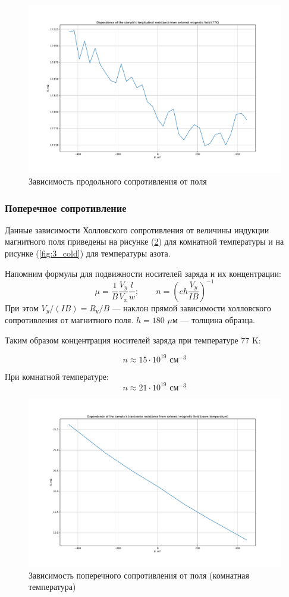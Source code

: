 \documentclass[a4paper, 12pt]{article}
\begin{document}
\begin{figure}[H]
	\centering
	\includegraphics[width=\linewidth]{3_longitudunal.pdf}
	\caption{Зависимость продольного сопротивления от поля}
	\label{fig:3_long}
\end{figure}

\subsubsection{Поперечное сопротивление}

Данные зависимости Холловского сопротивления от величины индукции магнитного поля приведены на рисунке (\ref{fig:3_room}) для комнатной температуры и на рисунке (\ref{fig:3_cold}) для температуры азота.

Напомним формулы для подвижности носителей заряда и их концентрации:
$$\mu=\frac{1}{B}\frac{V_y}{V_x}\frac{l}{w}; \qquad n=\left(eh\frac{V_y}{IB}\right)^{-1}  $$
При этом $V_y/(IB) = R_y/B$ --- наклон прямой зависимости холловского сопротивления от магнитного поля. $h = 180$ $\mu$м --- толщина образца.

Таким образом концентрация носителей заряда при температуре 77 K:

$$n\approx15 \cdot 10^{19}\text{ см}^{-3}$$ 

При комнатной температуре:
$$n\approx21 \cdot 10^{19}\text{ см}^{-3}$$ 
\begin{figure}[H]
	\centering
	\includegraphics[width=0.8\linewidth]{3_room.pdf}
	\caption{Зависимость поперечного сопротивления от поля (комнатная температура)}
	\label{fig:3_room}
\end{figure}
\end{document}
